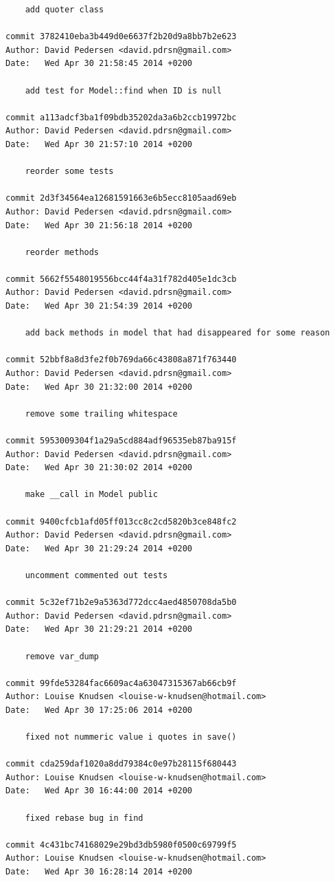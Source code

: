 \documentclass[12pt]{article}
\begin{document}
\begin{verbatim}
    add quoter class

commit 3782410eba3b449d0e6637f2b20d9a8bb7b2e623
Author: David Pedersen <david.pdrsn@gmail.com>
Date:   Wed Apr 30 21:58:45 2014 +0200

    add test for Model::find when ID is null

commit a113adcf3ba1f09bdb35202da3a6b2ccb19972bc
Author: David Pedersen <david.pdrsn@gmail.com>
Date:   Wed Apr 30 21:57:10 2014 +0200

    reorder some tests

commit 2d3f34564ea12681591663e6b5ecc8105aad69eb
Author: David Pedersen <david.pdrsn@gmail.com>
Date:   Wed Apr 30 21:56:18 2014 +0200

    reorder methods

commit 5662f5548019556bcc44f4a31f782d405e1dc3cb
Author: David Pedersen <david.pdrsn@gmail.com>
Date:   Wed Apr 30 21:54:39 2014 +0200

    add back methods in model that had disappeared for some reason

commit 52bbf8a8d3fe2f0b769da66c43808a871f763440
Author: David Pedersen <david.pdrsn@gmail.com>
Date:   Wed Apr 30 21:32:00 2014 +0200

    remove some trailing whitespace

commit 5953009304f1a29a5cd884adf96535eb87ba915f
Author: David Pedersen <david.pdrsn@gmail.com>
Date:   Wed Apr 30 21:30:02 2014 +0200

    make __call in Model public

commit 9400cfcb1afd05ff013cc8c2cd5820b3ce848fc2
Author: David Pedersen <david.pdrsn@gmail.com>
Date:   Wed Apr 30 21:29:24 2014 +0200

    uncomment commented out tests

commit 5c32ef71b2e9a5363d772dcc4aed4850708da5b0
Author: David Pedersen <david.pdrsn@gmail.com>
Date:   Wed Apr 30 21:29:21 2014 +0200

    remove var_dump

commit 99fde53284fac6609ac4a63047315367ab66cb9f
Author: Louise Knudsen <louise-w-knudsen@hotmail.com>
Date:   Wed Apr 30 17:25:06 2014 +0200

    fixed not nummeric value i quotes in save()

commit cda259daf1020a8dd79384c0e97b28115f680443
Author: Louise Knudsen <louise-w-knudsen@hotmail.com>
Date:   Wed Apr 30 16:44:00 2014 +0200

    fixed rebase bug in find

commit 4c431bc74168029e29bd3db5980f0500c69799f5
Author: Louise Knudsen <louise-w-knudsen@hotmail.com>
Date:   Wed Apr 30 16:28:14 2014 +0200


\end{verbatim}
\end{document}
